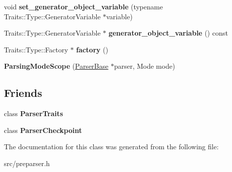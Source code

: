 \begin{DoxyCompactItemize}
\item 
\hypertarget{classv8_1_1internal_1_1_parser_base_1_1_b_a_s_e___e_m_b_e_d_d_e_d_a093589069385eb98d8fa30899e994b1f}{}void {\bfseries set\+\_\+generator\+\_\+object\+\_\+variable} (typename Traits\+::\+Type\+::\+Generator\+Variable $\ast$variable)\label{classv8_1_1internal_1_1_parser_base_1_1_b_a_s_e___e_m_b_e_d_d_e_d_a093589069385eb98d8fa30899e994b1f}

\item 
\hypertarget{classv8_1_1internal_1_1_parser_base_1_1_b_a_s_e___e_m_b_e_d_d_e_d_a1ca19792b3ccd1d09341844c5f9fd4b8}{}Traits\+::\+Type\+::\+Generator\+Variable $\ast$ {\bfseries generator\+\_\+object\+\_\+variable} () const \label{classv8_1_1internal_1_1_parser_base_1_1_b_a_s_e___e_m_b_e_d_d_e_d_a1ca19792b3ccd1d09341844c5f9fd4b8}

\item 
\hypertarget{classv8_1_1internal_1_1_parser_base_1_1_b_a_s_e___e_m_b_e_d_d_e_d_a53daa944fc570bb12e50b64bd7051cf0}{}Traits\+::\+Type\+::\+Factory $\ast$ {\bfseries factory} ()\label{classv8_1_1internal_1_1_parser_base_1_1_b_a_s_e___e_m_b_e_d_d_e_d_a53daa944fc570bb12e50b64bd7051cf0}

\item 
\hypertarget{classv8_1_1internal_1_1_parser_base_1_1_b_a_s_e___e_m_b_e_d_d_e_d_a194c39f59c32c9d0d4bbc73229a0853a}{}{\bfseries Parsing\+Mode\+Scope} (\hyperlink{classv8_1_1internal_1_1_parser_base}{Parser\+Base} $\ast$parser, Mode mode)\label{classv8_1_1internal_1_1_parser_base_1_1_b_a_s_e___e_m_b_e_d_d_e_d_a194c39f59c32c9d0d4bbc73229a0853a}

\end{DoxyCompactItemize}
\subsection*{Friends}
\begin{DoxyCompactItemize}
\item 
\hypertarget{classv8_1_1internal_1_1_parser_base_1_1_b_a_s_e___e_m_b_e_d_d_e_d_a5f14c645eff20b2a5bad62347cde341c}{}class {\bfseries Parser\+Traits}\label{classv8_1_1internal_1_1_parser_base_1_1_b_a_s_e___e_m_b_e_d_d_e_d_a5f14c645eff20b2a5bad62347cde341c}

\item 
\hypertarget{classv8_1_1internal_1_1_parser_base_1_1_b_a_s_e___e_m_b_e_d_d_e_d_a36ba09a5b76b5aa08057abbe746dc439}{}class {\bfseries Parser\+Checkpoint}\label{classv8_1_1internal_1_1_parser_base_1_1_b_a_s_e___e_m_b_e_d_d_e_d_a36ba09a5b76b5aa08057abbe746dc439}

\end{DoxyCompactItemize}


The documentation for this class was generated from the following file\+:\begin{DoxyCompactItemize}
\item 
src/preparser.\+h\end{DoxyCompactItemize}
